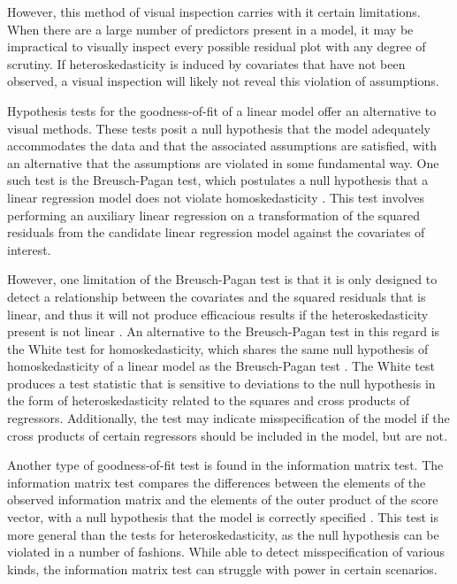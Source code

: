 \documentclass[review]{elsarticle}
\begin{document}
		However, this method of visual inspection carries with it certain limitations. When there are a large number of predictors present in a model, it may be impractical to visually inspect every
		possible residual plot with any degree of scrutiny. If heteroskedasticity is induced by covariates that have not been observed, a visual inspection will likely
		not reveal this violation of assumptions.

		Hypothesis tests for the goodness-of-fit of a linear model offer an alternative to visual methods. These tests posit a null hypothesis that the model adequately accommodates the data and that
		the associated assumptions are satisfied, with an alternative that the assumptions are violated in some fundamental way. One such test is the Breusch-Pagan test, which postulates a null hypothesis
		that a linear regression model does not violate homoskedasticity \citep{Breusch}. This test involves performing an auxiliary linear regression on a transformation of the squared residuals from
		the candidate linear regression model against the covariates of interest.

		However, one limitation of the Breusch-Pagan test is that it is only designed to detect a relationship between the covariates and the squared residuals that is linear, and thus it will not
		produce efficacious results if the heteroskedasticity present is not linear \citep{Waldman}. An alternative to the Breusch-Pagan test in this regard is the White test for homoskedasticity,
		which shares the same null hypothesis of homoskedasticity of a linear model as the Breusch-Pagan test \citep{White1980}. The White test produces a test statistic that is sensitive to deviations to
		the null hypothesis in the form of heteroskedasticity related to the squares and cross products of regressors. Additionally, the test may indicate misspecification of the model if the cross products
		of certain regressors should be included in the model, but are not.

		Another type of goodness-of-fit test is found in the information matrix test. The information matrix test compares the differences between the elements of the observed information matrix and the elements
		of the outer product of the score vector, with a null hypothesis that the model is correctly specified \citep{White1982}. This test is more general than the tests for heteroskedasticity, as the null
		hypothesis can be violated in a number of fashions. While able to
		detect misspecification of various kinds, the information matrix test can struggle with power in certain scenarios.
  
\end{document}

